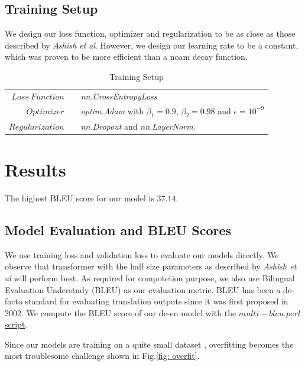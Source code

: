 \documentclass{article}
\begin{document}
\subsection{Training Setup}
We design our loss function, optimizer and regularization to be as close as those described by \textit{Ashish et al}\cite{vaswani2017attention}. However, we design our learning rate to be a constant, which was proven to be more efficient than a noam decay function\cite{devlin2018bert}.

\begin{table}[H]\caption{Training Setup}
    \centering %
    \begin{tabular}{r c p{10cm} }
    \toprule
    $Loss\ Function$ && \textit{nn.CrossEntropyLoss}\\
    $Optimizer$ && \textit{optim.Adam} with $\beta_1=0.9$, $\beta_2=0.98$ and $\epsilon=10^{-9}$\\
    $Regularization$ && \textit{nn.Dropout} and \textit{nn.LayerNorm}.\\
    \bottomrule
    \end{tabular}
    \label{tab:table_of_setup}
\end{table}

\section{Results}
The highest BLEU score for our model is $37.14$.

\subsection{Model Evaluation and BLEU Scores}

We use training loss and validation loss to evaluate our models directly. We observe that transformer with the half size parameters as described by \textit{Ashish et al}\cite{vaswani2017attention} will perform best.
As required for compotetion purpose, we also use Bilingual Evaluation Understudy (BLEU) as our evaluation metric. BLEU has been a de-facto standard for evaluating translation outputs since it was first proposed in 2002. We compute the BLEU score of our de-en model with the $multi-bleu.perl$ \href{https://github.com/moses-smt/mosesdecoder/blob/master/scripts/generic/multi-bleu.perl}{script}.

Since our models are training on a quite small dataset , overfitting becomes the most troublesome challenge shown in Fig.\ref{fig: overfit}.
\end{document}
